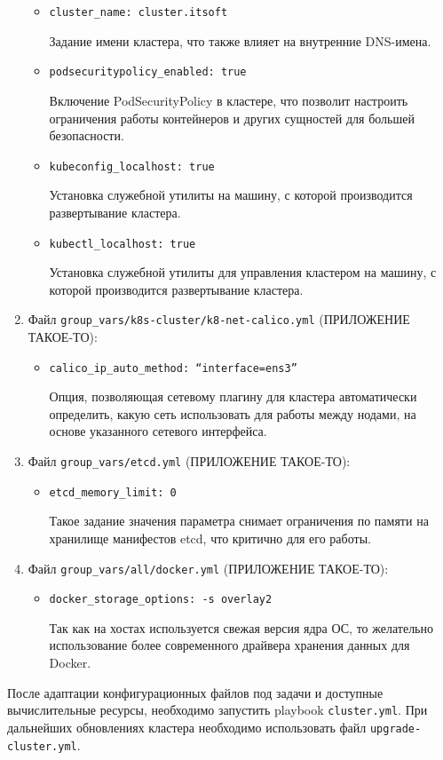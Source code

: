 \begin{enumerate}
\begin{itemize}
            \item \texttt{cluster\_name: cluster.itsoft}

                Задание имени кластера, что также влияет на внутренние DNS-имена.

            \item \texttt{podsecuritypolicy\_enabled: true}

                Включение PodSecurityPolicy в кластере, что позволит настроить ограничения работы контейнеров и других сущностей для большей безопасности.

            \item \texttt{kubeconfig\_localhost: true}

                Установка служебной утилиты на машину, с которой производится развертывание кластера.

            \item \texttt{kubectl\_localhost: true}

                Установка служебной утилиты для управления кластером на машину, с которой производится развертывание кластера.

        \end{itemize}
    \item Файл \texttt{group\_vars/k8s-cluster/k8-net-calico.yml} (ПРИЛОЖЕНИЕ ТАКОЕ-ТО):
        \begin{itemize}
            \item \texttt{calico\_ip\_auto\_method: “interface=ens3”}

                Опция, позволяющая сетевому плагину для кластера автоматически определить, какую сеть использовать для работы между нодами, на основе указанного сетевого интерфейса.

        \end{itemize}
    \item Файл \texttt{group\_vars/etcd.yml} (ПРИЛОЖЕНИЕ ТАКОЕ-ТО):
        \begin{itemize}
            \item \texttt{etcd\_memory\_limit: 0}

                Такое задание значения параметра снимает ограничения по памяти на хранилище манифестов etcd, что критично для его работы.

        \end{itemize}
    \item Файл \texttt{group\_vars/all/docker.yml} (ПРИЛОЖЕНИЕ ТАКОЕ-ТО):
        \begin{itemize}
            \item \texttt{docker\_storage\_options: -s overlay2}

                Так как на хостах используется свежая версия ядра ОС, то желательно использование более современного драйвера хранения данных для Docker.

        \end{itemize}
\end{enumerate}

После адаптации конфигурационных файлов под задачи и доступные вычислительные ресурсы, необходимо запустить playbook \texttt{cluster.yml}. При дальнейших обновлениях кластера необходимо использовать файл \texttt{upgrade-cluster.yml}.
